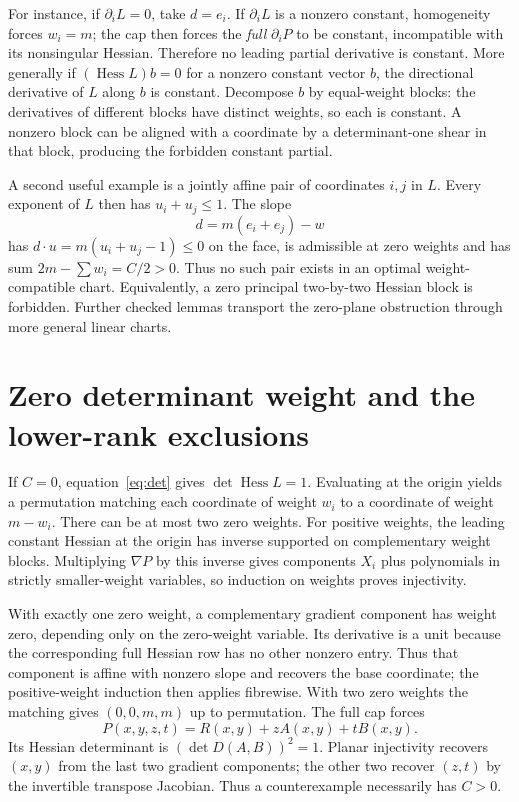 \documentclass[11pt,a4paper]{article}
\newcommand{\Hess}{\operatorname{Hess}}
\begin{document}
For instance, if $\partial_i L=0$, take $d=e_i$. If $\partial_i L$ is a nonzero constant, homogeneity forces $w_i=m$; the cap then forces the \emph{full} $\partial_i P$ to be constant, incompatible with its nonsingular Hessian. Therefore no leading partial derivative is constant. More generally if $(\Hess L)b=0$ for a nonzero constant vector $b$, the directional derivative of $L$ along $b$ is constant. Decompose $b$ by equal-weight blocks: the derivatives of different blocks have distinct weights, so each is constant. A nonzero block can be aligned with a coordinate by a determinant-one shear in that block, producing the forbidden constant partial.

A second useful example is a jointly affine pair of coordinates $i,j$ in $L$. Every exponent of $L$ then has $u_i+u_j\le1$. The slope
\[
 d=m(e_i+e_j)-w
\]
has $d\cdot u=m(u_i+u_j-1)\le0$ on the face, is admissible at zero weights and has sum $2m-\sum w_i=C/2>0$. Thus no such pair exists in an optimal weight-compatible chart. Equivalently, a zero principal two-by-two Hessian block is forbidden. Further checked lemmas transport the zero-plane obstruction through more general linear charts.

\section{Zero determinant weight and the lower-rank exclusions}
If $C=0$, equation~\eqref{eq:det} gives $\det\Hess L=1$. Evaluating at the origin yields a permutation matching each coordinate of weight $w_i$ to a coordinate of weight $m-w_i$. There can be at most two zero weights. For positive weights, the leading constant Hessian at the origin has inverse supported on complementary weight blocks. Multiplying $\nabla P$ by this inverse gives components $X_i$ plus polynomials in strictly smaller-weight variables, so induction on weights proves injectivity.

With exactly one zero weight, a complementary gradient component has weight zero, depending only on the zero-weight variable. Its derivative is a unit because the corresponding full Hessian row has no other nonzero entry. Thus that component is affine with nonzero slope and recovers the base coordinate; the positive-weight induction then applies fibrewise. With two zero weights the matching gives $(0,0,m,m)$ up to permutation. The full cap forces
\[
 P(x,y,z,t)=R(x,y)+z A(x,y)+t B(x,y).
\]
Its Hessian determinant is $(\det D(A,B))^2=1$. Planar injectivity recovers $(x,y)$ from the last two gradient components; the other two recover $(z,t)$ by the invertible transpose Jacobian. Thus a counterexample necessarily has $C>0$.
\end{document}
